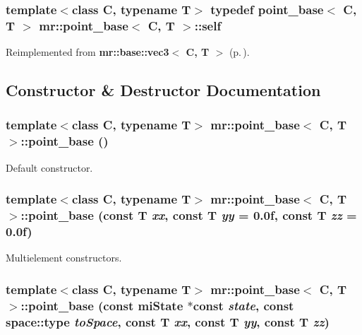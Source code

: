 \subsubsection{\setlength{\rightskip}{0pt plus 5cm}template$<$class C, typename T$>$ typedef {\bf point\_\-base}$<$ C, T $>$ {\bf mr::point\_\-base}$<$ C, T $>$::{\bf self}}\label{structmr_1_1point__base_w0}




Reimplemented from {\bf mr::base::vec3$<$ C, T $>$} {\rm (p.\,\pageref{structmr_1_1base_1_1vec3_w0})}.

\subsection{Constructor \& Destructor Documentation}
\subsubsection{\setlength{\rightskip}{0pt plus 5cm}template$<$class C, typename T$>$ {\bf mr::point\_\-base}$<$ C, T $>$::{\bf point\_\-base} ()\hspace{0.3cm}{\tt  [inline]}}\label{structmr_1_1point__base_z75_0}


Default constructor. 

\subsubsection{\setlength{\rightskip}{0pt plus 5cm}template$<$class C, typename T$>$ {\bf mr::point\_\-base}$<$ C, T $>$::{\bf point\_\-base} (const T {\em xx}, const T {\em yy} = 0.0f, const T {\em zz} = 0.0f)\hspace{0.3cm}{\tt  [inline]}}\label{structmr_1_1point__base_z75_1}


Multielement constructors. 

\subsubsection{\setlength{\rightskip}{0pt plus 5cm}template$<$class C, typename T$>$ {\bf mr::point\_\-base}$<$ C, T $>$::{\bf point\_\-base} (const mi\-State $\ast$const {\em state}, const {\bf space::type} {\em to\-Space}, const T {\em xx}, const T {\em yy}, const T {\em zz})\hspace{0.3cm}{\tt  [inline]}}\label{structmr_1_1point__base_z75_2}


